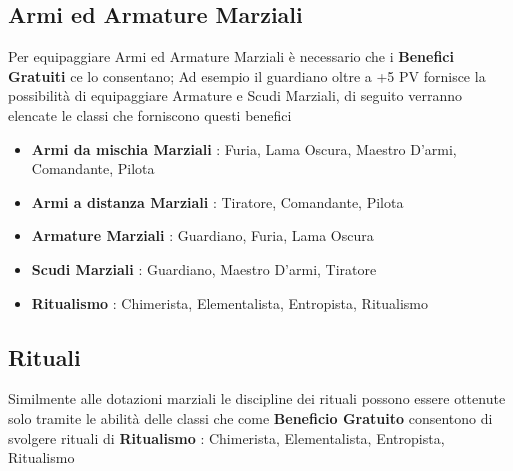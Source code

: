 \documentclass{article}
\begin{document}
\subsection{Armi ed Armature Marziali}
Per equipaggiare Armi ed Armature Marziali è necessario che i \textbf{Benefici Gratuiti} ce lo consentano; Ad esempio il guardiano oltre a +5 PV fornisce la possibilità di equipaggiare Armature e Scudi Marziali, di seguito verranno elencate le classi che forniscono questi benefici
\begin{itemize}
  \item \textbf{Armi da mischia Marziali} : Furia, Lama Oscura, Maestro D'armi, Comandante, Pilota
  \item \textbf{Armi a distanza Marziali} : Tiratore, Comandante, Pilota
  \item \textbf{Armature Marziali} : Guardiano, Furia, Lama Oscura
  \item \textbf{Scudi Marziali} : Guardiano, Maestro D'armi, Tiratore
  \item \textbf{Ritualismo} : Chimerista, Elementalista, Entropista, Ritualismo
\end{itemize}


\subsection{Rituali}
Similmente alle dotazioni marziali le discipline dei rituali possono essere ottenute solo tramite le abilità delle classi che come \textbf{Beneficio Gratuito} consentono di svolgere rituali di \textbf{Ritualismo} : Chimerista, Elementalista, Entropista, Ritualismo

\newpage
\end{document}

